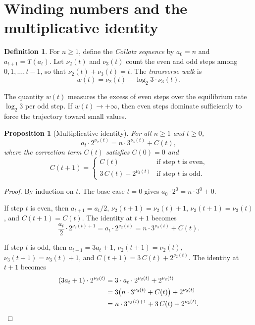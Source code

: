 \documentclass[manuscript]{aomart}
\theoremstyle{plain}
\newtheorem{proposition}[theorem]{Proposition}
\theoremstyle{definition}
\newtheorem{definition}[theorem]{Definition}
\theoremstyle{remark}
\numberwithin{equation}{section}
\begin{document}
\section{Winding numbers and the multiplicative identity}
\label{sec:winding}

\begin{definition}\label{def:parity-counts}
For $n \ge 1$, define the \emph{Collatz sequence} by $a_0 = n$ and
$a_{t+1} = T(a_t)$.  Let $\nu_2(t)$ and $\nu_3(t)$ count the even
and odd steps among $0, 1, \ldots, t-1$, so that
$\nu_2(t) + \nu_3(t) = t$.  The \emph{transverse walk} is
\begin{equation}\label{eq:walk}
  w(t) = \nu_2(t) - \log_2 3 \cdot \nu_3(t).
\end{equation}
\end{definition}

The quantity $w(t)$ measures the excess of even steps over the
equilibrium rate $\log_2 3$ per odd step.  If $w(t) \to +\infty$,
then even steps dominate sufficiently to force the trajectory toward
small values.

\begin{proposition}[Multiplicative identity]\label{prop:identity}
For all $n \ge 1$ and $t \ge 0$,
\begin{equation}\label{eq:identity}
  a_t \cdot 2^{\nu_2(t)} = n \cdot 3^{\nu_3(t)} + C(t),
\end{equation}
where the \emph{correction term} $C(t)$ satisfies $C(0) = 0$ and
\begin{equation}\label{eq:C-recurrence}
  C(t+1) =
  \begin{cases}
    C(t) & \text{if step } t \text{ is even,}\\
    3\,C(t) + 2^{\nu_2(t)} & \text{if step } t \text{ is odd.}
  \end{cases}
\end{equation}
\end{proposition}

\begin{proof}
By induction on $t$.  The base case $t = 0$ gives
$a_0 \cdot 2^0 = n \cdot 3^0 + 0$.

If step $t$ is even, then $a_{t+1} = a_t/2$,
$\nu_2(t{+}1) = \nu_2(t) + 1$, $\nu_3(t{+}1) = \nu_3(t)$, and
$C(t{+}1) = C(t)$.  The identity at $t{+}1$ becomes
\[
  \frac{a_t}{2} \cdot 2^{\nu_2(t)+1}
  = a_t \cdot 2^{\nu_2(t)}
  = n \cdot 3^{\nu_3(t)} + C(t).
\]

If step $t$ is odd, then $a_{t+1} = 3a_t + 1$,
$\nu_2(t{+}1) = \nu_2(t)$, $\nu_3(t{+}1) = \nu_3(t) + 1$, and
$C(t{+}1) = 3\,C(t) + 2^{\nu_2(t)}$.  The identity at $t{+}1$ becomes
\begin{align*}
  (3a_t + 1) \cdot 2^{\nu_2(t)}
  &= 3 \cdot a_t \cdot 2^{\nu_2(t)} + 2^{\nu_2(t)} \\
  &= 3\bigl(n \cdot 3^{\nu_3(t)} + C(t)\bigr) + 2^{\nu_2(t)} \\
  &= n \cdot 3^{\nu_3(t)+1} + 3\,C(t) + 2^{\nu_2(t)}. \qedhere
\end{align*}
\end{proof}
\end{document}
